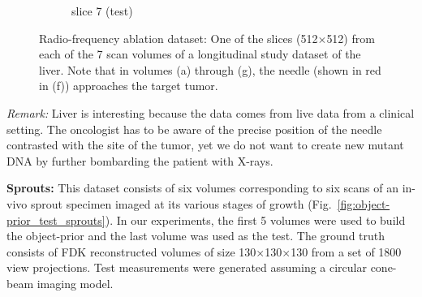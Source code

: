 \documentclass[journal]{IEEEtran}
\begin{document}
\begin{figure}[h!]
\begin{subfigure}[b]{0.23\linewidth}
 \caption{slice 7 (test)}
    \end{subfigure}     
     \caption{Radio-frequency ablation dataset: One of the slices
       (512$\times$512) from each of the 7 scan volumes of a
       longitudinal study dataset of the liver. Note that in volumes
       (a) through (g), the needle (shown in red in (f)) approaches
       the target tumor.}
\label{fig:RFA2_test_object-prior}
\end{figure}

\textit{Remark:} Liver is interesting because the data comes from live
data from a clinical setting.  The oncologist has to be aware of the
precise position of the needle contrasted with the site of the tumor,
yet we do not want to create new mutant DNA by further bombarding the
patient with X-rays.


\textbf{Sprouts:} This dataset consists of six volumes corresponding
to six scans of an in-vivo sprout specimen imaged at its various
stages of growth (Fig.~\ref{fig:object-prior_test_sprouts}).  In our
experiments, the first 5 volumes were used to build the object-prior
and the last volume was used as the test. The ground truth consists of
FDK reconstructed volumes of size 130$\times$130$\times$130 from a set
of 1800 view projections. Test measurements were generated assuming a
circular cone-beam imaging model.

\end{document}
